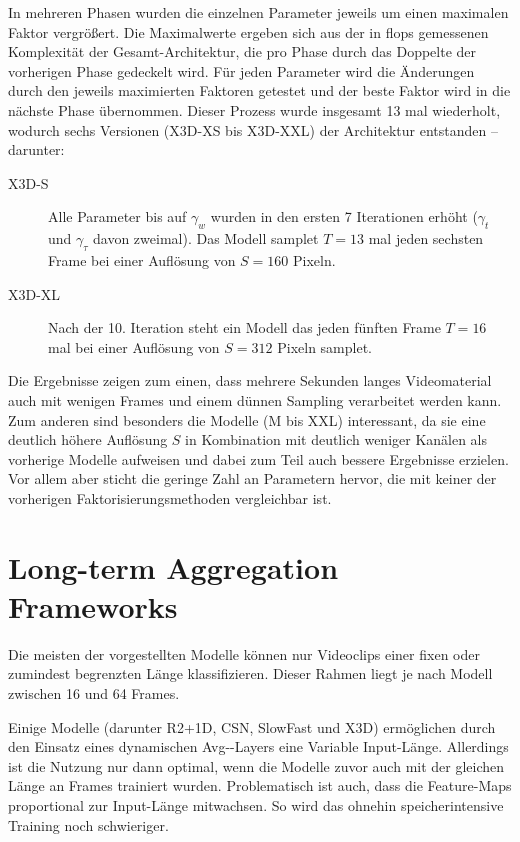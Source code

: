 In mehreren Phasen wurden die einzelnen Parameter jeweils um einen maximalen Faktor vergrößert.
Die Maximalwerte ergeben sich aus der in \gls{flops} gemessenen Komplexität der Gesamt-Architektur, die pro Phase durch das Doppelte der vorherigen Phase gedeckelt wird.
Für jeden Parameter wird die Änderungen durch den jeweils maximierten Faktoren getestet und der beste Faktor wird in die nächste Phase übernommen.
Dieser Prozess wurde insgesamt 13 mal wiederholt, wodurch sechs Versionen (X3D-XS bis X3D-XXL) der Architektur entstanden -- darunter:

\begin{description}
    \item[X3D-S] Alle Parameter bis auf $\gamma_w$ wurden in den ersten 7 Iterationen erhöht ($\gamma_t$ und $\gamma_\tau$ davon zweimal).
    Das Modell samplet $T=13$ mal jeden sechsten Frame bei einer Auflösung von $S=160$ Pixeln.
    \item[X3D-XL] Nach der 10. Iteration steht ein Modell das jeden fünften Frame $T=16$ mal bei einer Auflösung von $S=312$ Pixeln samplet.
\end{description}

Die Ergebnisse zeigen zum einen, dass mehrere Sekunden langes Videomaterial auch mit wenigen Frames und einem dünnen Sampling verarbeitet werden kann.
Zum anderen sind besonders die Modelle (M bis XXL) interessant, da sie eine deutlich höhere Auflösung $S$ in Kombination mit deutlich weniger Kanälen als vorherige Modelle aufweisen und dabei zum Teil auch bessere Ergebnisse erzielen.
Vor allem aber sticht die geringe Zahl an Parametern hervor, die mit keiner der vorherigen Faktorisierungsmethoden vergleichbar ist.


\section{Long-term Aggregation Frameworks}
\label{sec:long-term-aggregation-frameworks}

Die meisten der vorgestellten Modelle können nur Videoclips einer fixen oder zumindest begrenzten Länge klassifizieren.
Dieser Rahmen liegt je nach Modell zwischen 16 und 64 Frames.

Einige Modelle (darunter R2+1D, CSN, SlowFast und X3D) ermöglichen durch den Einsatz eines dynamischen Avg-\pool-Layers eine Variable Input-Länge.
Allerdings ist die Nutzung nur dann optimal, wenn die Modelle zuvor auch mit der gleichen Länge an Frames trainiert wurden.
Problematisch ist auch, dass die Feature-Maps proportional zur Input-Länge mitwachsen.
So wird das ohnehin speicherintensive Training noch schwieriger.

